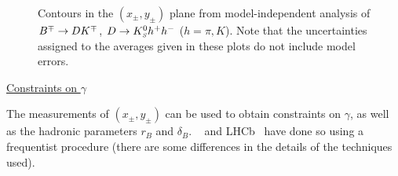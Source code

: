 

\begin{figure}[htb]
  \begin{center}
  \end{center}
  \vspace{-0.5cm}
  \caption{
    Contours in the $(x_\pm, y_\pm)$ plane from model-independent analysis of $B^\mp \to DK^\mp$, $D \to K^0_{\scriptscriptstyle S} h^+ h^-$ ($h = \pi,K$).
    Note that the uncertainties assigned to the averages given in these plots
    do not include model errors.        
  }
  \label{fig:cp_uta:cus:dalitz-modInd_2d}
\end{figure}

\vspace{3ex}

\noindent
\underline{Constraints on $\gamma$}

The measurements of $(x_\pm, y_\pm)$ can be used to obtain constraints on 
$\gamma$, as well as the hadronic parameters $r_B$ and $\delta_B$.
\belle~\cite{Aihara:2012aw} and LHCb~\cite{Aaij:2012hu,Aaij:2014uva}
have done so using a frequentist procedure (there are some differences in the details of the techniques used).

